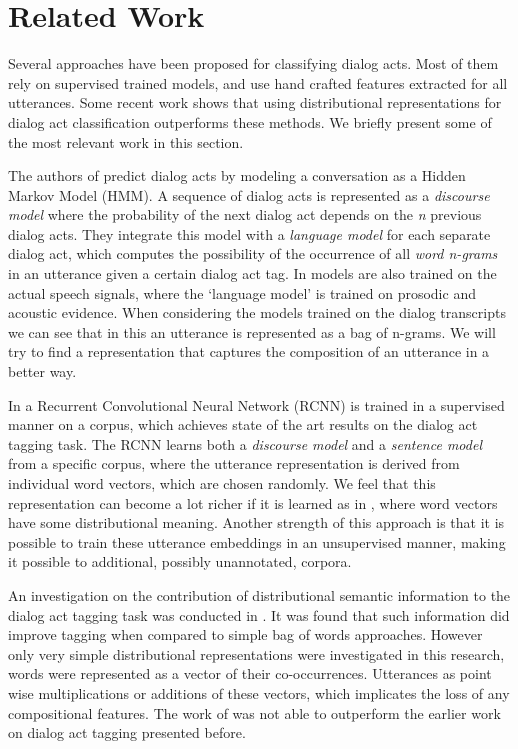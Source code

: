 \section{Related Work}\label{sec:relwork}
Several approaches have been proposed for classifying dialog acts. Most of them rely on supervised trained models, and use hand crafted features extracted for all utterances. Some recent work shows that using distributional representations for dialog act classification outperforms these methods. We briefly present some of the most relevant work in this section.

The authors of  predict dialog acts by modeling a conversation as a Hidden Markov Model (HMM). A sequence of dialog acts is represented as a \emph{discourse model} where the probability of the next dialog act depends on the \emph{n} previous dialog acts. They integrate this model with a \emph{language model} for each separate dialog act, which computes the possibility of the occurrence of all \emph{word n-grams} in an utterance given a certain dialog act tag. In  models are also trained on the actual speech signals, where the `language model' is trained on prosodic and acoustic evidence.  When considering the models trained on the dialog transcripts we can see that in this an utterance is represented as a bag of n-grams. We will try to find a representation that captures the composition of an utterance in a better way.

In  a Recurrent Convolutional Neural Network (RCNN) is trained in a supervised manner on a corpus, which achieves state of the art results on the dialog act tagging task. The RCNN learns both a \emph{discourse model} and a \emph{sentence model} from a specific corpus, where the utterance representation is derived from individual word vectors, which are chosen randomly. We feel that this representation can become a lot richer if it is learned as in , where word vectors have some distributional meaning. Another strength of this approach is that it is possible to train these utterance embeddings in an unsupervised manner, making it possible to additional, possibly unannotated, corpora. 

An investigation on the contribution of distributional semantic information to the dialog act tagging task was conducted in . It was found that such information did improve tagging when compared to simple bag of words approaches. However only very simple distributional representations were investigated in this research, words were represented as a vector of their co-occurrences. Utterances as point wise multiplications or additions of these vectors, which implicates the loss of any compositional features. The work of  was not able to outperform the earlier work on dialog act tagging presented before. 

